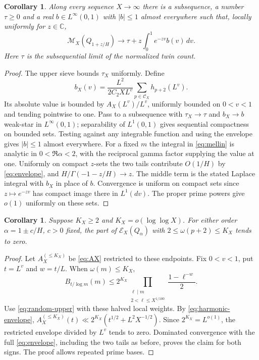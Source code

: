 \documentclass[11pt]{article}
\newtheorem{corollary}[theorem]{Corollary}
\theoremstyle{remark}
\newcommand{\err}{\mathcal E_X}
\newcommand{\Mcal}{\mathcal M_X}
\begin{document}
\begin{corollary}
Along every sequence $X\to\infty$ there is a subsequence, a number
$\tau\ge0$ and a real $b\in L^\infty(0,1)$ with $|b|\le1$ almost
everywhere such that, locally uniformly for $z\in\mathbb C$,
\[
\Mcal(Q_{1+z/H})\longrightarrow
\tau+ z\int_0^1 e^{-zv}b(v)\,dv.
\]
Here $\tau$ is the subsequential limit of the normalized twin count.
\end{corollary}
\begin{proof}
The upper sieve bounds $\tau_X$ uniformly. Define
\[
 b_X(v)=\frac{L^2}{2C_2X L^v}
 \sum_{p\in\mathcal C_X} h_{p+2}(L^v).
\]
Its absolute value is bounded by $A_X(L^v)/L^v$, uniformly bounded
on $0<v<1$ and tending pointwise to one. Pass to a subsequence with
$\tau_X\to\tau$ and $b_X\to b$ weak-star in $L^\infty(0,1)$;
separability of $L^1(0,1)$ gives sequential compactness on bounded
sets. Testing against any integrable function and using the envelope
gives $|b|\le1$ almost everywhere. For a fixed $m$ the integral in
\eqref{eq:mellin} is analytic in $0<\Re\alpha<2$, with the reciprocal
gamma factor supplying the value at one. Uniformly on compact
$z$-sets the two tails contribute $O(1/H)$ by
\eqref{eq:envelope}, and $H/\Gamma(-1-z/H)\to z$.
The middle term is the stated Laplace integral with $b_X$ in place
of $b$. Convergence is uniform on compact sets since
$z\mapsto e^{-zv}$ has compact image there in $L^1(dv)$.
The proper prime powers give $o(1)$ uniformly on these sets.
\end{proof}

\begin{corollary}
Suppose $K_X\ge2$ and $K_X=o(\log\log X)$. For either order
$\alpha=1\pm c/H$, $c>0$ fixed, the part of $\err(Q_\alpha)$ with
$2\le\omega(p+2)\le K_X$ tends to zero.
\end{corollary}
\begin{proof}
Let $A_X^{(\le K_X)}$ be \eqref{eq:AX} restricted to these endpoints.
Fix $0<v<1$, put $t=L^v$ and $w=t/L$. When $\omega(m)\le K_X$,
\[
 B_{t/\log m}(m)
 \le 2^{K_X}\!\!\!\!\prod_{\substack{\ell\mid m\\2<\ell\le X^{1/100}}}
 \frac{1-\ell^{-w}}2.
\]
Use \eqref{eq:random-upper} with these halved local weights.
By \eqref{eq:harmonic-envelope},
$A_X^{(\le K_X)}(t)\ll2^{K_X}(t^{1/2}+L^2X^{-1/2})$.
Since $2^{K_X}=L^{o(1)}$, the restricted envelope divided by $L^v$
tends to zero. Dominated convergence with the full
\eqref{eq:envelope}, including the two tails as before, proves the
claim for both signs. The proof allows repeated prime bases.
\end{proof}
\end{document}
